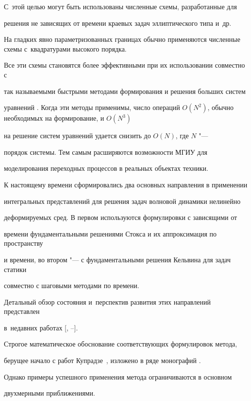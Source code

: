 С~этой целью могут быть использованы численные схемы, разработанные для

решения не зависящих от времени краевых задач эллиптического типа \cite{petu:bib2,petu:bib5} и~др. 

На гладких явно параметризованных границах обычно применяются численные схемы с~квадратурами высокого порядка.



Все эти схемы становятся более эффективными при их использовании совместно с

так называемыми быстрыми методами формирования и решения больших систем

уравнений \cite{petu:bib3,petu:bib6}. Когда эти методы применимы, число операций $O(N^2)$, обычно необходимых на формирование, и $O(N^3)$

на решение систем уравнений удается снизить до $O(N)$, где $N$ "---

порядок системы. Тем самым расширяются возможности МГИУ для

моделирования переходных процессов в реальных объектах техники.



К настоящему времени сформировались два основных направления в применении

интегральных представлений для решения задач волновой динамики нелинейно

деформируемых сред. В первом используются формулировки с зависящими от

времени фундаментальными решениями Стокса и их аппроксимация по пространству

и времени, во втором "--- с фундаментальными решения Кельвина для задач статики

совместно с шаговыми методами по времени. 

Детальный обзор состояния и~перспектив развития этих направлений представлен 

в~недавних работах [, --].



Строгое математическое обоснование соответствующих формулировок метода,

берущее начало с работ Купрадзе~\cite{petu:bib10}, изложено в ряде монографий \cite{petu:bib5, petu:bib7}.

Однако примеры успешного применения метода ограничиваются в основном

двухмерными приближениями.




